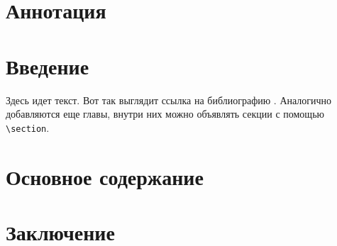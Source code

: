 \documentclass{mipt-thesis-bs}
\begin{document}
\setcounter{page}{2}
\chapter{Аннотация}

\newpage
\tableofcontents
\newpage

\chapter{Введение}

Здесь идет текст. Вот так выглядит ссылка на библиографию \cite{Meneses2012}. Аналогично добавляются еще главы, внутри них можно объявлять секции с помощью \verb|\section|.

\chapter{Основное содержание}

\chapter{Заключение}

\printbib
\end{document}
